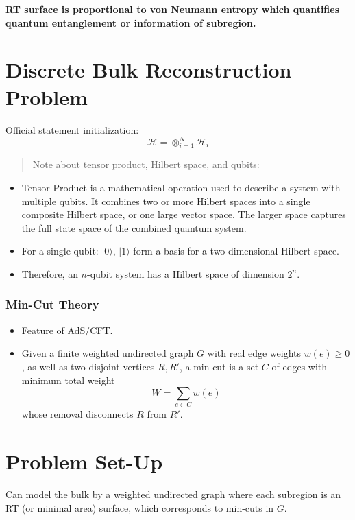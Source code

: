 \documentclass[12pt]{article}
\begin{document}
\textbf{RT surface is proportional to von Neumann entropy which quantifies quantum entanglement or information of subregion.}

\section*{Discrete Bulk Reconstruction Problem}
Official statement initialization:
\[
\mathcal{H} = \otimes^{N}_{i=1}\mathcal{H}_{i}
\]
\begin{quote}
    Note about tensor product, Hilbert space, and qubits:
\end{quote}
\begin{itemize}
    \item Tensor Product is a mathematical operation used to describe a system with multiple qubits. It combines two or more Hilbert spaces into a single composite Hilbert space, or one large vector space. The larger space captures the full state space of the combined quantum system.
    \item For a single qubit: $|0\rangle$, $|1\rangle$ form a basis for a two-dimensional Hilbert space.
    \item Therefore, an $n$-qubit system has a Hilbert space of dimension $2^n$.
\end{itemize}

\subsubsection*{Min-Cut Theory}
\begin{itemize}
    \item Feature of AdS/CFT.
    \item Given a finite weighted undirected graph \( G \) with real edge weights \( w(e) \geq 0 \), as well as two disjoint vertices \( R, R' \), a min-cut is a set \( C \) of edges with minimum total weight
    \[
    W = \sum_{e \in C} w(e)
    \]
    whose removal disconnects \( R \) from \( R' \).
\end{itemize}

\section*{Problem Set-Up}
Can model the bulk by a weighted undirected graph where each subregion is an RT (or minimal area) surface, which corresponds to min-cuts in \( G \).
\end{document}
